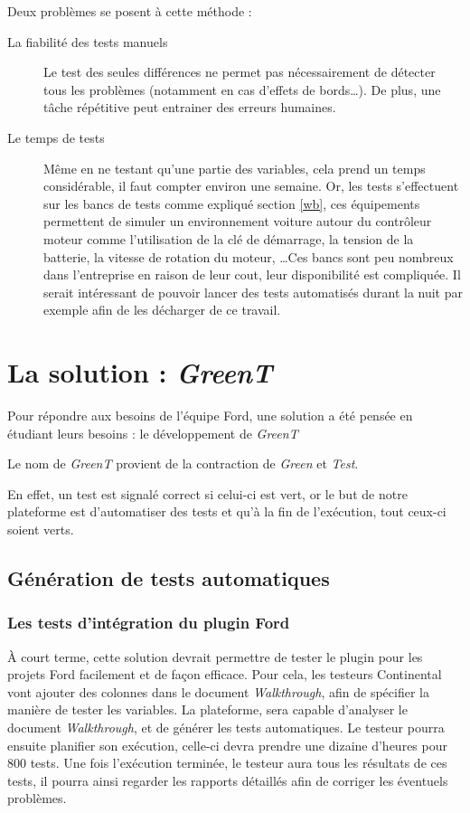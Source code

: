 	\vspace{20px}
	Deux problèmes se posent à cette méthode : 
	\begin{description}
		\item[La fiabilité des tests manuels] Le test des seules différences ne permet pas nécessairement de détecter tous les problèmes (notamment en cas d'effets de bords\ldots). De plus, une tâche répétitive peut entrainer des erreurs humaines.
		\item[Le temps de tests] Même en ne testant qu'une partie des variables, cela prend un temps considérable, il faut compter environ une semaine.\newline
			Or, les tests s'effectuent sur les bancs de tests comme expliqué section \ref{wb}, ces équipements permettent de simuler un environnement voiture autour du contrôleur moteur comme
			l'utilisation de la clé de démarrage, la tension de la batterie, la vitesse de rotation du moteur, \ldots Ces bancs sont peu
			nombreux dans l'entreprise en raison de leur cout, leur disponibilité est compliquée. Il serait intéressant de pouvoir lancer
			des tests automatisés durant la nuit par exemple afin de les décharger de ce travail.
	\end{description}
	
\newpage
	\section{La solution : \textit{GreenT}}
	Pour répondre aux besoins de l'équipe Ford, une solution a été pensée en étudiant leurs besoins : le développement de \textit{GreenT}
	\begin{remarque}
		Le nom de \textit{GreenT} provient de la contraction de \textit{Green} et \textit{Test}.
		
		En effet, un test est signalé correct si celui-ci est vert, or le but de notre plateforme est d'automatiser des tests et qu'à la fin de l'exécution, tout ceux-ci soient verts.
	\end{remarque}
	
	\subsection{Génération de tests automatiques}
	\subsubsection{Les tests d'intégration du plugin Ford}
	À court terme, cette solution devrait permettre de tester le plugin pour les projets Ford facilement et de façon efficace. Pour cela, les testeurs Continental vont ajouter des colonnes dans le document \textit{Walkthrough}, afin de spécifier la manière de tester les variables. La plateforme, sera capable d'analyser le document \textit{Walkthrough}, et de générer les tests automatiques. Le testeur pourra ensuite planifier son exécution, celle-ci devra prendre une dizaine d'heures pour 800 tests. Une fois l'exécution terminée, le testeur aura tous les résultats de ces tests, il pourra ainsi regarder les rapports détaillés afin de corriger les éventuels problèmes.
	
